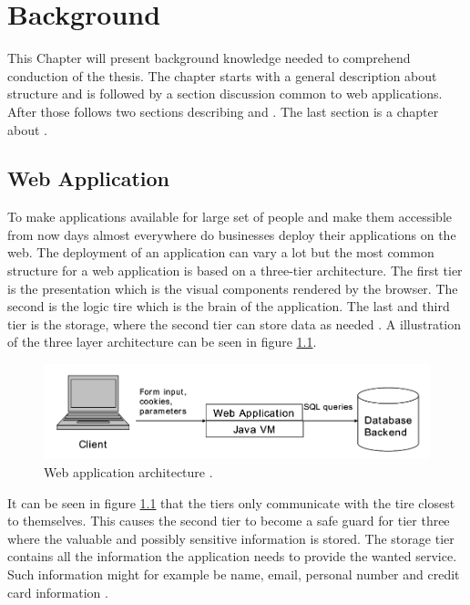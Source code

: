 \chapter{Background}
This Chapter will present background knowledge needed to comprehend conduction of the thesis. The chapter starts with a general description about \textit{} structure and is followed by a section discussion common \textit{} to web applications. After those follows two sections describing \textit{} and \textit{}. The last section is a chapter about \textit{}.


\section{Web Application}
\label{WebApplication}
To make applications available for large set of people and make them accessible from now days almost everywhere do businesses deploy their applications on the web. The deployment of an application can vary a lot but the most common structure for a web application is based on a three-tier architecture. The first tier is the presentation which is the visual components rendered by the browser. The second is the logic tire which is the brain of the application. The last and third tier is the storage, where the second tier can store data as needed \parencite{JustinClarke-Salt2009SIAa}. A illustration of the three layer architecture can be seen in figure \ref{fig:webApplication-Haldar}.

\begin{figure}
	\centering
	\includegraphics[width=\textwidth]{images/webApplication-Haldar.png}
	\caption{Web application architecture \cite{Haldar}.}
	\label{fig:webApplication-Haldar}
\end{figure}

It can be seen in figure \ref{fig:webApplication-Haldar} that the tiers only communicate with the tire closest to themselves. This causes the second tier to become a safe guard for tier three where the valuable and possibly sensitive information is stored. The storage tier contains all the information the application needs to provide the wanted service. Such information might for example be name, email, personal number and credit card information \parencite{JustinClarke-Salt2009SIAa}.

